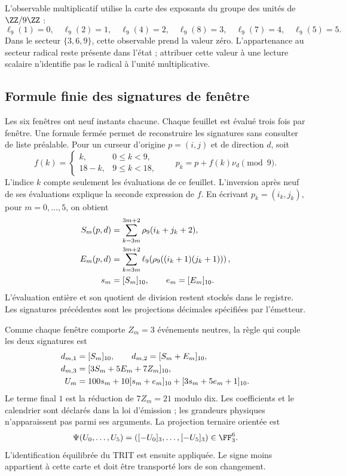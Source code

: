 L'observable multiplicatif utilise la carte des exposants du groupe des
unités de \(\ZZ/9\ZZ\) :
\[
 \ell_9(1)=0,\quad\ell_9(2)=1,\quad\ell_9(4)=2,\quad
 \ell_9(8)=3,\quad\ell_9(7)=4,\quad\ell_9(5)=5.
\]
Dans le secteur \(\{3,6,9\}\), cette observable prend la valeur zéro.
L’appartenance au secteur radical reste présente dans l’état ; attribuer
cette valeur à une lecture scalaire n’identifie pas le radical à l’unité
multiplicative.

\subsection{Formule finie des signatures de fenêtre}

Les six fenêtres ont neuf instants chacune. Chaque feuillet est évalué
trois fois par fenêtre. Une formule fermée permet de reconstruire les
signatures sans consulter de liste préalable. Pour un curseur d’origine
\(p=(i,j)\) et de direction \(d\), soit
\[
 f(k)=\begin{cases}k,&0\le k<9,\\18-k,&9\le k<18,
 \end{cases}\qquad p_k=p+f(k)\nu_d\pmod9.
\]
L’indice \(k\) compte seulement les évaluations de ce feuillet.
L’inversion après neuf de ses évaluations explique la seconde
expression de \(f\). En écrivant \(p_k=(i_k,j_k)\), pour
\(m=0,\ldots,5\), on obtient
\begin{align}
 S_m(p,d)&=\sum_{k=3m}^{3m+2}\rho_9(i_k+j_k+2),\notag\\
 E_m(p,d)&=\sum_{k=3m}^{3m+2}
       \ell_9\!\left(\rho_9((i_k+1)(j_k+1))\right),\notag\\
 s_m&=[S_m]_{10},\qquad e_m=[E_m]_{10}.
 \label{vi:vi:reg:firmas}
\end{align}
L’évaluation entière et son quotient de division restent stockés dans
le registre. Les signatures précédentes sont les projections décimales
spécifiées par l’émetteur.

Comme chaque fenêtre comporte \(Z_m=3\) événements neutres, la règle qui
couple les deux signatures est
\begin{align}
 d_{m,1}&=[S_m]_{10},\qquad
 d_{m,2}=[S_m+E_m]_{10},\notag\\
 d_{m,3}&=[3S_m+5E_m+7Z_m]_{10},\notag\\
 U_m&=100s_m+10[s_m+e_m]_{10}+[3s_m+5e_m+1]_{10}.
 \label{vi:eq:emisor-seis}
\end{align}
Le terme final \(1\) est la réduction de \(7Z_m=21\) modulo
dix. Les coefficients et le calendrier sont déclarés dans la loi
d’émission ; les grandeurs physiques n’apparaissent pas parmi ses arguments.
La projection ternaire orientée est
\begin{equation}
 \Psi(U_0,\ldots,U_5)=([-U_0]_3,\ldots,[-U_5]_3)
 \in\FF_3^6.
 \label{vi:eq:psi-catalogo}
\end{equation}
L'identification équilibrée du TRIT est ensuite appliquée. Le signe
moins appartient à cette carte et doit être transporté lors de son changement.


